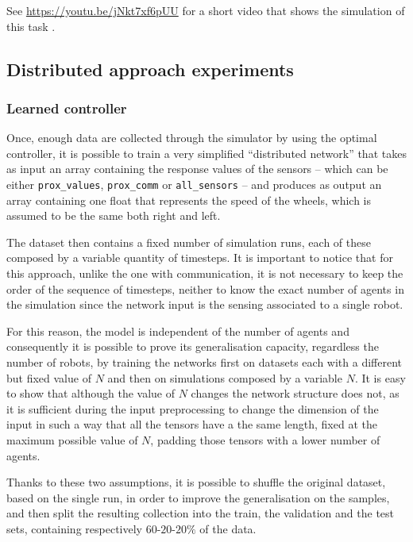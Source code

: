 See \url{https://youtu.be/jNkt7xf6pUU} for a short video that shows the 
simulation of this task \cite[][]{task1manual}.

\subsection{Distributed approach experiments}
\label{subsec:ex1distr}
\subsubsection{Learned controller}
\label{subsubsec:learneddist}

Once, enough data are collected through the simulator by using the optimal 
controller, it is possible to train a very simplified ``distributed network'' 
that takes as input an array containing the response values of the sensors – 
which can be either \texttt{prox\_values}, \texttt{prox\_comm} or 
\texttt{all\_sensors} – and produces as output an array containing one float 
that represents the speed of the wheels, which is assumed to be the same 
both right and left.

The dataset then contains a fixed number of simulation runs, each of these 
composed by a variable quantity of timesteps. It is important to notice that 
for this approach, unlike the one with communication, it is not necessary to 
keep the order of the sequence of timesteps, neither to know the exact 
number of agents in the simulation since the network input is the sensing 
associated to a single robot.

For this reason, the model is independent of the number of agents and 
consequently it is possible to prove its generalisation capacity, regardless 
the number of robots, by training the networks first on datasets each with a 
different but fixed value of $N$ and then on simulations composed by a 
variable $N$.
It is easy to show that although the value of $N$ changes the network 
structure does not, as it is sufficient during the input preprocessing to 
change the dimension of the input in such a way that all the tensors have a 
the same length, fixed at the maximum possible value of $N$, padding 
those tensors with a lower number of agents.

Thanks to these two assumptions, it is possible to shuffle the original 
dataset, based on the single run, in order to improve the generalisation on 
the samples, and then split the resulting collection into the train, the 
validation and the test sets, containing respectively $60$-$20$-$20\%$ of 
the data. 

